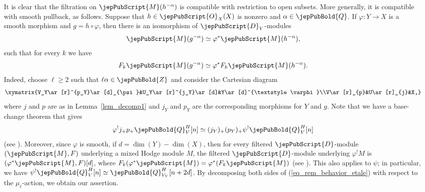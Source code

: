 \begin{remark}\label{rem_behavior_etale}
It is clear that the filtration on $\jepPubScript{M}(h^{-\alpha})$ is compatible with restriction to open subsets.
More generally, it is compatible with smooth pullback, as follows.
Suppose that $h\in\jepPubScript{O}_X(X)$ is nonzero and $\alpha \in \jepPubBold{Q}$.
If $\varphi\colon Y\to X$ is a smooth morphism and $g=h\circ \varphi$, then there is an isomorphism of $\jepPubScript{D}_Y$-modules
$$\jepPubScript{M}(g^{-\alpha})\simeq\varphi^*\jepPubScript{M}(h^{-\alpha}),$$
such that for every $k$ we have
$$F_k\jepPubScript{M}(g^{-\alpha})\simeq\varphi^*F_k\jepPubScript{M}(h^{-\alpha}).$$
Indeed, choose $\ell\geqslant 2$ such that $\ell\alpha\in\jepPubBold{Z}$ and consider the 
Cartesian diagram
$$
{\def\labelstyle{\textstyle}\xymatrix{V_Y\ar[r]^{p_Y}\ar[d]_{\psi}&U_Y\ar[r]^{j_Y}\ar[d]&Y\ar[d]^{\textstyle\varphi}\\V\ar[r]_{p}&U\ar[r]_{j}&X,}}
$$
where $j$ and $p$ are as in Lemma~\ref{lem_decomp1} and $j_Y$ and $p_Y$ are the corresponding morphisms for $Y$ and $g$. 
Note that we have a base-change theorem that gives
\begin{equation}\label{eq_rem_behavior_etale}
\varphi^!j_+p_+\jepPubBold{Q}^H_V[n]\simeq (j_Y)_+(p_Y)_+\psi^!\jepPubBold{Q}^H_V[n]
\end{equation}
(see \cite[(4.4.3)]{Saito-MHM}).
Moreover, since $\varphi$ is smooth, if $d=\dim(Y)-\dim(X)$, then for every filtered $\jepPubScript{D}$-module 
$(\jepPubScript{M},F)$ underlying a mixed Hodge module $M$, the filtered $\jepPubScript{D}$-module
underlying $\varphi^!M$ is $(\varphi^*\jepPubScript{M},F)[d]$, where $F_k(\varphi^*\jepPubScript{M})=\varphi^*(F_{k}\jepPubScript{M})$
(see \cite[3.5]{Saito-MHP}).
This also applies to $\psi$; in particular, we have $\psi^!\jepPubBold{Q}_V^H[n]\simeq\jepPubBold{Q}_{V_Y}^H[n+2d]$.
By decomposing both sides of (\ref{eq_rem_behavior_etale}) with respect to the $\mu_{\ell}$-action, we
obtain our assertion.
\end{remark}










